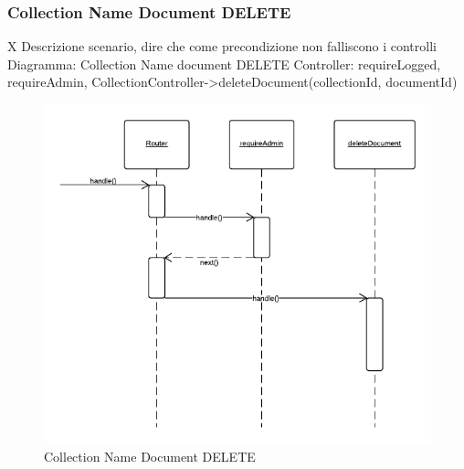 \subsubsection{Collection Name Document DELETE} X
Descrizione scenario, dire che come precondizione non falliscono i controlli
Diagramma: Collection Name document DELETE
Controller: requireLogged, requireAdmin, CollectionController->deleteDocument(collectionId, documentId)
\begin{figure}[H]
	\begin{center} 
		\includegraphics[scale=0.60]{scenari/Collection Name Document DELETE.png} 
		\caption{Collection Name Document DELETE}
	\end{center} 
\end{figure}

